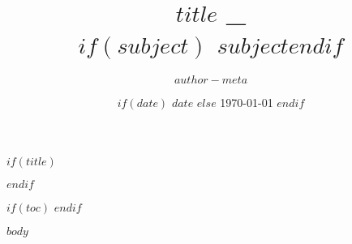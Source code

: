\documentclass{article}
\title{
	{\contrastfont\fontsize{24pt}{12pt}\upshape\bfseries $title$} \fontsize{25pt}{12pt}\normalfont\textcolor{ContrastColor}{\_}
	\\
	$if(subject)$ \fontsize{18pt}{30pt}\normalfont\textcolor{AccentColor}{$subject$}$endif$
}
\date{
	\fontsize{12pt}{12pt}\normalfont\textcolor{AccentColor}{
		$if(date)$
			$date$
		$else$
			\today
		$endif$
	}
}
\author{
	\fontsize{12pt}{12pt}\normalfont\textcolor{AccentColor}{$author-meta$ }
}
\begin{document}
	$if(title)$
	\begin{titlingpage}

		\AddToShipoutPictureBG*{
			\AtPageUpperLeft{
				\raisebox{-\dimexpr\height+\topskip+1in}{
					\hspace*{1in}
					
				}
			}
		}

		\maketitle

	\end{titlingpage}
	$endif$

	$if(toc)$
	\tableofcontents
	\newpage
	$endif$

	$body$
\end{document}
